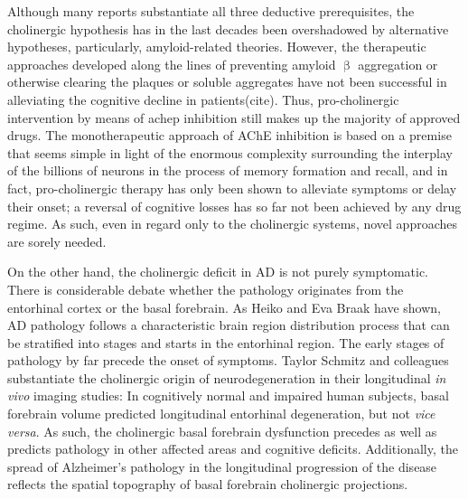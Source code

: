 Although many reports substantiate all three deductive prerequisites, the cholinergic hypothesis has in the last decades been overshadowed by alternative hypotheses, particularly, amyloid-related theories. However, the therapeutic approaches developed along the lines of preventing amyloid $\upbeta$ aggregation or otherwise clearing the plaques or soluble aggregates have not been successful in alleviating the cognitive decline in patients(cite). Thus, pro-cholinergic intervention by means of \ac{achep} inhibition still makes up the majority of approved drugs. The monotherapeutic approach of AChE inhibition is based on a premise that seems simple in light of the enormous complexity surrounding the interplay of the billions of neurons in the process of memory formation and recall, and in fact, pro-cholinergic therapy has only been shown to alleviate symptoms or delay their onset; a reversal of cognitive losses has so far not been achieved by any drug regime. As such, even in regard only to the cholinergic systems, novel approaches are sorely needed.

On the other hand, the cholinergic deficit in AD is not purely symptomatic. There is considerable debate whether the pathology originates from the entorhinal cortex or the basal forebrain. As Heiko and Eva Braak have shown,\cite{Braak1995} AD pathology follows a characteristic brain region distribution process that can be stratified into stages and starts in the entorhinal region. The early stages of pathology by far precede the onset of symptoms. Taylor Schmitz and colleagues substantiate the cholinergic origin of neurodegeneration in their longitudinal \emph{in vivo} imaging studies:\cite{Schmitz2016, Schmitz2018} In cognitively normal and impaired human subjects, basal forebrain volume predicted longitudinal entorhinal degeneration, but not \emph{vice versa}. As such, the cholinergic basal forebrain dysfunction precedes as well as predicts pathology in other affected areas and cognitive deficits.\cite{Schmitz2016} Additionally, the spread of Alzheimer's pathology in the longitudinal progression of the disease reflects the spatial topography of basal forebrain cholinergic projections.\cite{Schmitz2018}



